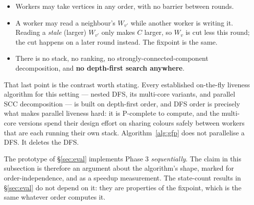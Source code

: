 \begin{itemize}
  \item Workers may take vertices in any order, with no barrier between rounds.
  \item A worker may read a neighbour's $W_{v'}$ while another worker is writing it. Reading a
        \emph{stale} (larger) $W_{v'}$ only makes $C$ larger, so $W_v$ is cut less this round; the
        cut happens on a later round instead. The fixpoint is the same.
  \item There is no stack, no ranking, no strongly-connected-component decomposition, and
        \textbf{no depth-first search anywhere}.
\end{itemize}

That last point is the contrast worth stating. Every established on-the-fly liveness algorithm for
this setting --- nested DFS, its multi-core variants, and parallel SCC decomposition --- is built on
depth-first order, and DFS order is precisely what makes parallel liveness hard: it is
P-complete to compute, and the multi-core versions spend their design effort on sharing colours
safely between workers that are each running their own stack. Algorithm~\ref{alg:gfp} does not
parallelise a DFS. It deletes the DFS.

\begin{remark}
The prototype of \S\ref{sec:eval} implements Phase 3 \emph{sequentially}. The claim in this
subsection is therefore an argument about the algorithm's shape, marked \proved{} for
order-independence, and \openq{} as a speedup measurement. The state-count results in
\S\ref{sec:eval} do not depend on it: they are properties of the fixpoint, which is the same
whatever order computes it.
\end{remark}
